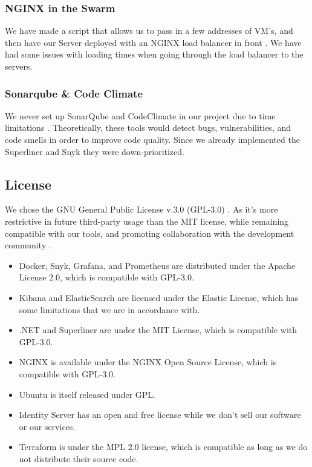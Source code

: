 \subsubsection{NGINX in the Swarm}
We have made a script that allows us to pass in a few addresses of VM's, and then have our Server deployed with an NGINX load balancer in front \autocite{nginx}. We have had some issues with loading times when going through the load balancer to the servers.  

\subsubsection{Sonarqube \& Code Climate}
We never set up SonarQube and CodeClimate in our project due to time limitations \autocite{sonarqube, codeclimate}. Theoretically, these tools would detect bugs, vulnerabilities, and code smells in order to improve code quality. Since we already implemented the Superliner and Snyk they were down-prioritized.

\subsection{License}
We chose the GNU General Public License v.3.0 (GPL-3.0) \autocite{gplv3}. As it's more restrictive in future third-party usage than the MIT license, while remaining compatible with our tools, and promoting collaboration with the development community \autocite{mitlicense}.

\begin{itemize}
    \item Docker, Snyk, Grafana, and Prometheus are distributed under the Apache License 2.0, which is compatible with GPL-3.0.
    \item Kibana and ElasticSearch are licensed under the Elastic License, which has some limitations that we are in accordance with.
    \item .NET and Superliner are under the MIT License, which is compatible with GPL-3.0.
    \item NGINX is available under the NGINX Open Source License, which is compatible with GPL-3.0.
    \item Ubuntu is itself released under GPL.
    \item Identity Server has an open and free license while we don't sell our software or our services.
    \item Terraform is under the MPL 2.0 license, which is compatible as long as we do not distribute their source code.
\end{itemize}
